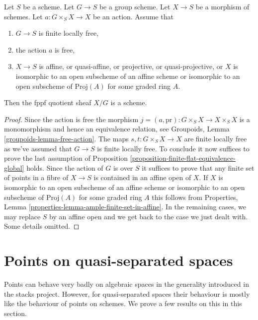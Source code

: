\begin{lemma}
\label{lemma-quotient-scheme}
Let $S$ be a scheme. Let $G \to S$ be a group scheme. Let $X \to S$ be
a morphism of schemes. Let $a : G \times_S X \to X$ be an action. Assume that
\begin{enumerate}
\item $G \to S$ is finite locally free,
\item the action $a$ is free,
\item $X \to S$ is affine, or quasi-affine, or projective, or
quasi-projective, or $X$ is isomorphic to an open subscheme of an
affine scheme or isomorphic to an open subscheme of $\text{Proj}(A)$
for some graded ring $A$.
\end{enumerate}
Then the fppf quotient sheaf $X/G$ is a scheme.
\end{lemma}

\begin{proof}
Since the action is free the morphism
$j = (a, \text{pr}) : G \times_S X \to X \times_S X$
is a monomorphism and hence an equivalence relation, see
Groupoids, Lemma \ref{groupoids-lemma-free-action}. The maps
$s, t : G \times_S X \to X$
are finite locally free as we've assumed that $G \to S$ is finite locally
free. To conclude it now suffices to prove the last assumption of
Proposition \ref{proposition-finite-flat-equivalence-global} holds.
Since the action of $G$ is over $S$ it suffices to prove that
any finite set of points in a fibre of $X \to S$ is contained in an
affine open of $X$. If $X$ is isomorphic to an open subscheme of an
affine scheme or isomorphic to an open subscheme of $\text{Proj}(A)$
for some graded ring $A$ this follows from
Properties, Lemma \ref{properties-lemma-ample-finite-set-in-affine}.
In the remaining cases, we may replace $S$ by an affine open and we
get back to the case we just dealt with. Some details omitted.
\end{proof}




\section{Points on quasi-separated spaces}
\label{section-points-quasi-separated}

\noindent
Points can behave very badly on algebraic spaces in the generality introduced
in the stacks project. However, for quasi-separated spaces their behaviour
is mostly like the behaviour of points on schemes. We prove a few results
on this in this section.

